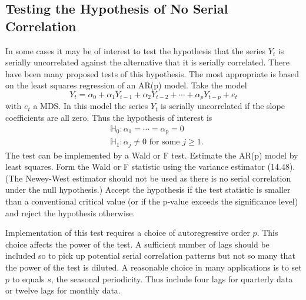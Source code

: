 \documentclass[10pt]{article}
\begin{document}
\subsection{Testing the Hypothesis of No Serial Correlation}
In some cases it may be of interest to test the hypothesis that the series $Y_{t}$ is serially uncorrelated against the alternative that it is serially correlated. There have been many proposed tests of this hypothesis. The most appropriate is based on the least squares regression of an AR(p) model. Take the model
$$
Y_{t}=\alpha_{0}+\alpha_{1} Y_{t-1}+\alpha_{2} Y_{t-2}+\cdots+\alpha_{p} Y_{t-p}+e_{t}
$$
with $e_{t}$ a MDS. In this model the series $Y_{t}$ is serially uncorrelated if the slope coefficients are all zero. Thus the hypothesis of interest is
$$
\begin{aligned}
&\mathbb{H}_{0}: \alpha_{1}=\cdots=\alpha_{p}=0 \\
&\mathbb{H}_{1}: \alpha_{j} \neq 0 \text { for some } j \geq 1 .
\end{aligned}
$$
The test can be implemented by a Wald or F test. Estimate the AR(p) model by least squares. Form the Wald or F statistic using the variance estimator (14.48). (The Newey-West estimator should not be used as there is no serial correlation under the null hypothesis.) Accept the hypothesis if the test statistic is smaller than a conventional critical value (or if the p-value exceeds the significance level) and reject the hypothesis otherwise.

Implementation of this test requires a choice of autoregressive order $p$. This choice affects the power of the test. A sufficient number of lags should be included so to pick up potential serial correlation patterns but not so many that the power of the test is diluted. A reasonable choice in many applications is to set $p$ to equals $s$, the seasonal periodicity. Thus include four lags for quarterly data or twelve lags for monthly data.
\end{document}
